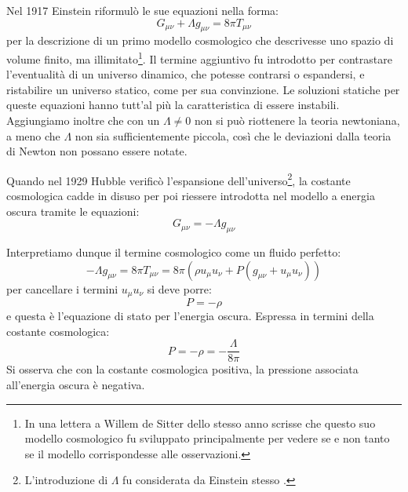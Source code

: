 Nel 1917 Einstein riformulò le sue equazioni nella forma:
\begin{equation}
    G_{\mu\nu} + \Lambda g_{\mu\nu} = 8\pi T_{\mu\nu}
    \label{eq.GR_eqeinstein_cosmologica}
\end{equation}
per la descrizione di un primo modello cosmologico che descrivesse uno spazio di volume finito, ma illimitato\footnote{In una lettera a Willem de Sitter dello stesso anno scrisse che questo suo modello cosmologico fu sviluppato principalmente per vedere se  e non tanto se il modello corrispondesse alle osservazioni.}. Il termine aggiuntivo fu introdotto per contrastare l'eventualità di un universo dinamico, che potesse contrarsi o espandersi, e ristabilire un universo statico, come per sua convinzione. Le soluzioni statiche per queste equazioni hanno tutt'al più la  caratteristica di essere instabili. Aggiungiamo inoltre che con un $\Lambda \neq 0$ non si può riottenere la teoria newtoniana, a meno che $\Lambda$ non sia sufficientemente piccola, così che le deviazioni dalla teoria di Newton non possano essere notate. 

Quando nel 1929 Hubble verificò l'espansione dell'universo\footnote{L'introduzione di $\Lambda$ fu considerata da Einstein stesso \emph{}.}, la costante cosmologica cadde in disuso per poi riessere introdotta nel modello a energia oscura tramite le equazioni:
\begin{equation}
    G_{\mu\nu} = - \Lambda g_{\mu\nu}
    \label{eq.einstein_cosmologica_en_oscura}
\end{equation}

Interpretiamo dunque il termine cosmologico come un fluido perfetto:
\begin{equation*}
    - \Lambda g_{\mu\nu} = 8\pi T_{\mu\nu} = 8\pi( \rho u_\mu u_\nu + P(g_{\mu\nu} +u_\mu u_\nu))
\end{equation*}
per cancellare i termini $u_\mu u_\nu$ si deve porre:
\begin{equation*}
    P= - \rho
\end{equation*}
e questa è l'equazione di stato per l'energia oscura. Espressa in termini della costante cosmologica:
\begin{equation*}
    P = - \rho = - \frac{\Lambda}{8\pi}
\end{equation*}
Si osserva che con la costante cosmologica positiva, la pressione associata all'energia oscura è negativa.

